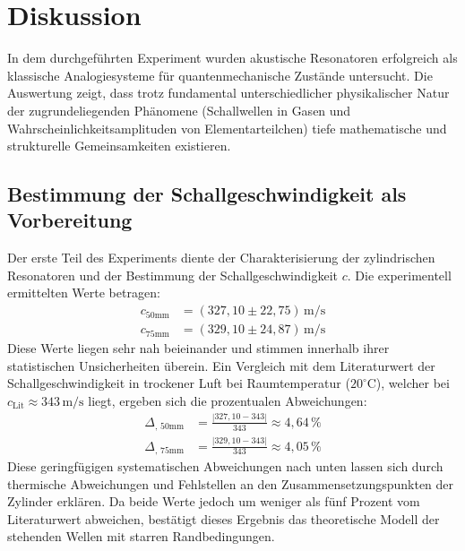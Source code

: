 \section{Diskussion}
\label{sec:Diskussion}

In dem durchgeführten Experiment wurden akustische Resonatoren erfolgreich als
klassische Analogiesysteme für quantenmechanische Zustände untersucht. Die
Auswertung zeigt, dass trotz fundamental unterschiedlicher physikalischer 
Natur der zugrundeliegenden Phänomene (Schallwellen in Gasen und 
Wahrscheinlichkeitsamplituden von Elementarteilchen) tiefe mathematische und
strukturelle Gemeinsamkeiten existieren.

\subsection{Bestimmung der Schallgeschwindigkeit als Vorbereitung}
Der erste Teil des Experiments diente der Charakterisierung der zylindrischen
Resonatoren und der Bestimmung der Schallgeschwindigkeit $c$. Die experimentell
ermittelten Werte betragen:
\begin{align*}
    c_{50\text{mm}} &= (327{,}10 \pm 22{,}75)\,\text{m/s} \\
    c_{75\text{mm}} &= (329{,}10 \pm 24{,}87)\,\text{m/s}
\end{align*}
Diese Werte liegen sehr nah beieinander und stimmen innerhalb ihrer statistischen
Unsicherheiten überein. Ein Vergleich mit dem Literaturwert der 
Schallgeschwindigkeit in trockener Luft bei Raumtemperatur ($20^\circ\text{C}$),
welcher bei $c_{\text{Lit}} \approx 343\,\text{m/s}$ \cite{schallgeschw} liegt,
ergeben sich die prozentualen Abweichungen:
\begin{align*}
    \Delta_{\text{, 50mm}} &= \frac{|327{,}10 - 343|}{343} \approx 4{,}64\,\% \\
    \Delta_{\text{, 75mm}} &= \frac{|329{,}10 - 343|}{343} \approx 4{,}05\,\%
\end{align*}
Diese geringfügigen systematischen Abweichungen nach unten lassen sich durch
thermische Abweichungen und Fehlstellen an den Zusammensetzungspunkten der
Zylinder erklären. Da beide Werte jedoch um weniger als fünf Prozent vom
Literaturwert abweichen, bestätigt dieses Ergebnis das theoretische Modell der
stehenden Wellen mit starren Randbedingungen. 

